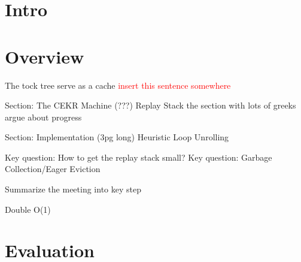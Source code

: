\documentclass[acmsmall]{acmart}
\newcommand\todo[1]{\textcolor{red}{#1}}
\begin{document}

\maketitle


\section{Intro}

\section{Overview}	
The tock tree serve as a cache \todo{insert this sentence somewhere}

Section: The CEKR Machine (???)
Replay Stack
the section with lots of greeks
argue about progress

Section: Implementation (3pg long)
Heuristic
Loop Unrolling

Key question: How to get the replay stack small?
Key question: Garbage Collection/Eager Eviction

Summarize the meeting into key step

Double O(1)
	
	
	
	
	\section{Evaluation}
\appendix
\end{document}
